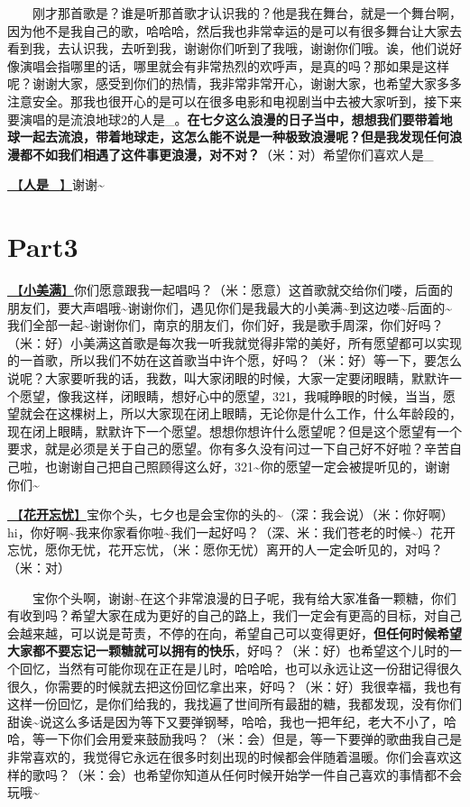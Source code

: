 \documentclass[]{ctexbook}
\begin{document}
  刚才那首歌是？谁是听那首歌才认识我的？他是我在舞台，就是一个舞台啊，因为他不是我自己的歌，哈哈哈，然后我也非常幸运的是可以有很多舞台让大家去看到我，去认识我，去听到我，谢谢你们听到了我哦，谢谢你们哦。诶，他们说好像演唱会指哪里的话，哪里就会有非常热烈的欢呼声，是真的吗？那如果是这样呢？谢谢大家，感受到你们的热情，我非常非常开心，谢谢大家，也希望大家多多注意安全。那我也很开心的是可以在很多电影和电视剧当中去被大家听到，接下来要演唱的是流浪地球2的人是\_。\textbf{在七夕这么浪漫的日子当中，想想我们要带着地球一起去流浪，带着地球走，这怎么能不说是一种极致浪漫呢？但是我发现任何浪漫都不如我们相遇了这件事更浪漫，对不对？}（米：对）希望你们喜欢人是\_

\hyperref[renshi]{🎵【\textbf{人是\_}】}谢谢\textasciitilde{}

\section{Part3}\label{nanjing-20240810-part3}

\hyperref[happy-ending]{🎵【\textbf{小美满}】}你们愿意跟我一起唱吗？（米：愿意）这首歌就交给你们喽，后面的朋友们，要大声唱哦\textasciitilde 谢谢你们，遇见你们是我最大的小美满\textasciitilde 到这边喽\textasciitilde 后面的\textasciitilde 我们全部一起\textasciitilde 谢谢你们，南京的朋友们，你们好，我是歌手周深，你们好吗？（米：好）小美满这首歌是每次我一听我就觉得非常的美好，所有愿望都可以实现的一首歌，所以我们不妨在这首歌当中许个愿，好吗？（米：好）等一下，要怎么说呢？大家要听我的话，我数，叫大家闭眼的时候，大家一定要闭眼睛，默默许一个愿望，像我这样，闭眼睛，想好心中的愿望，321，我喊睁眼的时候，当当，愿望就会在这棵树上，所以大家现在闭上眼睛，无论你是什么工作，什么年龄段的，现在闭上眼睛，默默许下一个愿望。想想你想许什么愿望呢？但是这个愿望有一个要求，就是必须是关于自己的愿望。你有多久没有问过一下自己好不好啦？辛苦自己啦，也谢谢自己把自己照顾得这么好，321\textasciitilde 你的愿望一定会被提听见的，谢谢你们\textasciitilde{}

\hyperref[no-worries]{🎵【\textbf{花开忘忧}】}宝你个头，七夕也是会宝你的头的\textasciitilde（深：我会说）（米：你好啊）hi，你好啊\textasciitilde 我来你家看你啦\textasciitilde 我们一起好吗？（深、米：我们苍老的时候\textasciitilde）花开忘忧，愿你无忧，花开忘忧，（米：愿你无忧）离开的人一定会听见的，对吗？（米：对）

  宝你个头啊，谢谢\textasciitilde 在这个非常浪漫的日子呢，我有给大家准备一颗糖，你们有收到吗？希望大家在成为更好的自己的路上，我们一定会有更高的目标，对自己会越来越，可以说是苛责，不停的在向，希望自己可以变得更好，\textbf{但任何时候希望大家都不要忘记一颗糖就可以拥有的快乐}，好吗？（米：好）也希望这个儿时的一个回忆，当然有可能你现在正在是儿时，哈哈哈，也可以永远让这一份甜记得很久很久，你需要的时候就去把这份回忆拿出来，好吗？（米：好）我很幸福，我也有这样一份回忆，是你们给我的，我找遍了世间所有最甜的糖，我都发现，没有你们甜诶\textasciitilde 说这么多话是因为等下又要弹钢琴，哈哈，我也一把年纪，老大不小了，哈哈，等一下你们会用爱来鼓励我吗？（米：会）但是，等一下要弹的歌曲我自己是非常喜欢的，我觉得它永远在很多时刻出现的时候都会伴随着温暖。你们会喜欢这样的歌吗？（米：会）也希望你知道从任何时候开始学一件自己喜欢的事情都不会玩哦\textasciitilde{}
\end{document}
